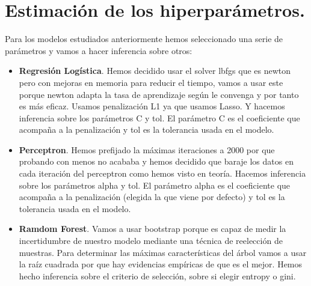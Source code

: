 \documentclass[a4paper,11pt]{article}
\begin{document}
\section{Estimación de los hiperparámetros.}

Para los modelos estudiados anteriormente hemos seleccionado una serie de parámetros y vamos a hacer inferencia sobre otros:

\begin{itemize}

\item \textbf{Regresión Logística}. Hemos decidido usar el solver lbfgs que es newton pero con mejoras en memoria para reducir el tiempo, vamos a usar este porque newton adapta la tasa de aprendizaje según le convenga y por tanto es más eficaz. Usamos penalización L1 ya que usamos Lasso. Y hacemos inferencia sobre los parámetros C y tol. El parámetro C es el coeficiente que acompaña a la penalización y tol es la tolerancia usada en el modelo.

\item \textbf{Perceptron}. Hemos prefijado la máximas iteraciones a 2000 por que probando con menos no acababa y hemos decidido que baraje los datos en cada iteración del perceptron como hemos visto en teoría. Hacemos inferencia sobre los parámetros alpha y tol. El parámetro alpha es el coeficiente que acompaña a la penalización (elegida la que viene por defecto) y tol es la tolerancia usada en el modelo.

\item \textbf{Ramdom Forest}. Vamos a usar bootstrap porque es capaz de medir la incertidumbre de nuestro modelo mediante una técnica de reelección de muestras. Para determinar las máximas características del árbol vamos a usar la raíz cuadrada por que hay evidencias empíricas de que es el mejor. Hemos hecho inferencia sobre el criterio de selección, sobre si elegir entropy o gini. 

\end{itemize}
\end{document}
